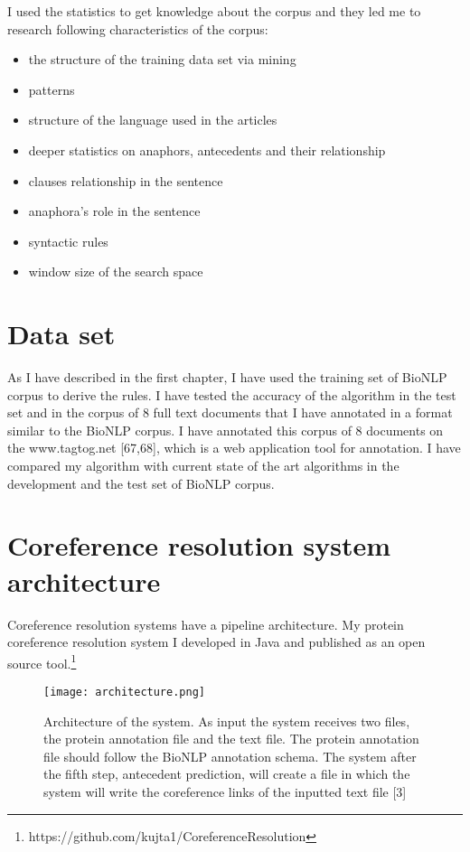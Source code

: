 I used the statistics to get knowledge about the corpus and they led me to research following characteristics of the corpus:

\begin{itemize}
	\item the structure of the training data set via mining
	\item patterns 
	\item structure of the language used in the articles
	\item deeper statistics on anaphors, antecedents and their relationship
	\item clauses relationship in the sentence
	\item anaphora's role in the sentence
	\item syntactic rules
	\item window size of the search space
\end{itemize}

\section{Data set}

As I have described in the first chapter, I have used the training set of BioNLP corpus to derive the rules. I have tested the accuracy of the algorithm in the test set and in the corpus of 8 full text documents that I have annotated in a format similar to the BioNLP corpus. I have annotated this corpus of 8 documents on the www.tagtog.net [67,68], which is a web application tool for annotation. I have compared my algorithm with current state of the art algorithms in the development and the test set of BioNLP corpus.

\section{Coreference resolution system architecture}

Coreference resolution systems have a pipeline architecture. My protein coreference resolution system I developed in Java and  published as an open source tool.\footnote{https://github.com/kujta1/CoreferenceResolution}
\newpage
\begin{figure}[t]
	\begin{center}
		\texttt{[image: architecture.png]} 
 		\caption[Architecture of the coreference resolution system]{ Architecture of the system. As input the system receives two files, the protein annotation file and the text file. The protein annotation file should follow the BioNLP annotation schema. The system after the fifth step, antecedent prediction, will create a file  in which the system will write the coreference links of the inputted text file  [3] }
		\label{Figure 8}
	\end{center}
\end{figure}

